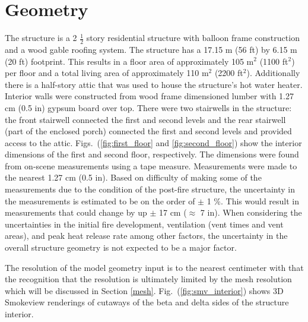 \documentclass[11pt,oneside]{book}
\begin{document}
\section{Geometry}
\label{geom}
The structure is a 2 $\tfrac{1}{2}$ story residential structure with balloon frame construction and a wood gable roofing system. The structure has a 17.15 m (56 ft) by 6.15 m (20 ft) footprint. This results in a floor area of approximately 105 m$^2$ (1100 ft$^2$) per floor and a total living area of approximately 110 m$^2$ (2200 ft$^2$). Additionally there is a half-story attic that was used to house the structure's hot water heater. Interior walls were constructed from wood frame dimensioned lumber with 1.27 cm (0.5 in) gypsum board over top. There were two stairwells in the structure: the front stairwell connected the first and second levels and the rear stairwell (part of the enclosed porch) connected the first and second levels and provided access to the attic. Figs.~(\ref{fig:first_floor} and \ref{fig:second_floor}) show the interior dimensions of the first and second floor, respectively. The dimensions were found from on-scene measurements using a tape measure. Measurements were made to the nearest 1.27 cm (0.5 in). Based on difficulty of making some of the measurements due to the condition of the post-fire structure, the uncertainty in the measurements is estimated to be on the order of $\pm$ 1 \%. This would result in measurements that could change by up $\pm$ 17 cm ($\approx$ 7 in). When considering the uncertainties in the initial fire development, ventilation (vent times and vent areas), and peak heat release rate among other factors, the uncertainty in the overall structure geometry is not expected to be a major factor.

The resolution of the model geometry input is to the nearest centimeter with that the recognition that the resolution is ultimately limited by the mesh resolution which will be discussed in Section \ref{mesh}. Fig.~(\ref{fig:smv_interior}) shows 3D Smokeview renderings of cutaways of the beta and delta sides of the structure interior.
\end{document}
